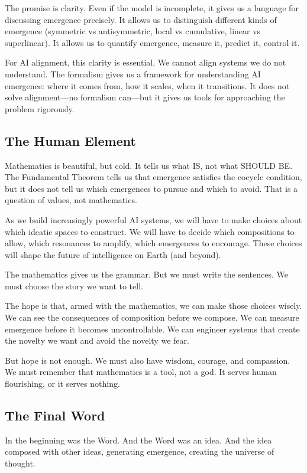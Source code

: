 The promise is clarity. Even if the model is incomplete, it gives us a language
for discussing emergence precisely. It allows us to distinguish different kinds
of emergence (symmetric vs antisymmetric, local vs cumulative, linear vs superlinear).
It allows us to quantify emergence, measure it, predict it, control it.

For AI alignment, this clarity is essential. We cannot align systems we do not
understand. The formalism gives us a framework for understanding AI emergence:
where it comes from, how it scales, when it transitions. It does not solve alignment---no
formalism can---but it gives us tools for approaching the problem rigorously.

\subsection{The Human Element}

Mathematics is beautiful, but cold. It tells us what IS, not what SHOULD BE.
The Fundamental Theorem tells us that emergence satisfies the cocycle condition,
but it does not tell us which emergences to pursue and which to avoid. That is
a question of values, not mathematics.

As we build increasingly powerful AI systems, we will have to make choices about
which ideatic spaces to construct. We will have to decide which compositions to
allow, which resonances to amplify, which emergences to encourage. These choices
will shape the future of intelligence on Earth (and beyond).

The mathematics gives us the grammar. But we must write the sentences. We must
choose the story we want to tell.

The hope is that, armed with the mathematics, we can make those choices wisely.
We can see the consequences of composition before we compose. We can measure
emergence before it becomes uncontrollable. We can engineer systems that create
the novelty we want and avoid the novelty we fear.

But hope is not enough. We must also have wisdom, courage, and compassion. We
must remember that mathematics is a tool, not a god. It serves human flourishing,
or it serves nothing.

\subsection{The Final Word}

In the beginning was the Word. And the Word was an idea. And the idea composed
with other ideas, generating emergence, creating the universe of thought.

